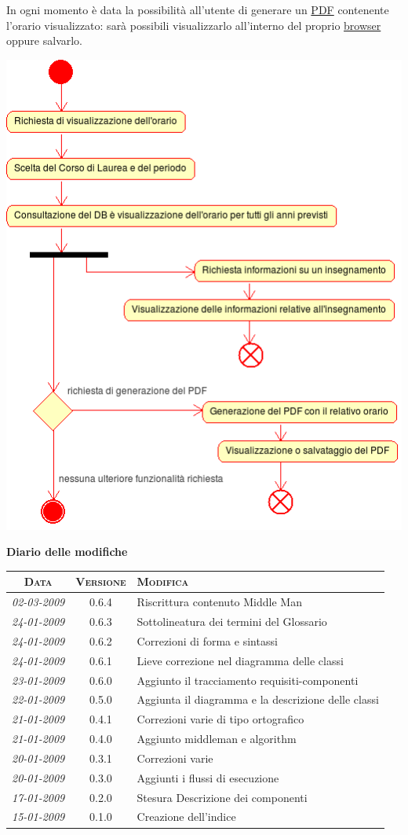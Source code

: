 \documentclass[11pt,a4paper]{article}
\newcommand{\modifiche} 
{
\newpage
\begin{center}
\textbf{Diario delle modifiche} \\
\bigskip
\begin{tabular}{|c|c|p{0.62\textwidth}|}
\hline
\textsc{Data} & \textsc{Versione} & \textsc{Modifica} \\
\hline
\hline
\textit{02-03-2009} & 0.6.4 & Riscrittura contenuto Middle Man \\
\hline
\textit{24-01-2009} & 0.6.3 & Sottolineatura dei termini del Glossario \\
\hline
\textit{24-01-2009} & 0.6.2 & Correzioni di forma e sintassi \\
\hline
\textit{24-01-2009} & 0.6.1 & Lieve correzione nel diagramma delle classi \\
\hline
\textit{23-01-2009} & 0.6.0 & Aggiunto il tracciamento requisiti-componenti \\
\hline
\textit{22-01-2009} & 0.5.0 & Aggiunta il diagramma e la descrizione delle classi \\
\hline
\textit{21-01-2009} & 0.4.1 & Correzioni varie di tipo ortografico\\
\hline
\textit{21-01-2009} & 0.4.0 & Aggiunto middleman e algorithm \\
\hline
\textit{20-01-2009} & 0.3.1 & Correzioni varie \\
\hline
\textit{20-01-2009} & 0.3.0 & Aggiunti i flussi di esecuzione \\
\hline
\textit{17-01-2009} & 0.2.0 & Stesura Descrizione dei componenti \\
\hline
\textit{15-01-2009} & 0.1.0 & Creazione dell'indice \\
\hline
\end{tabular}
\end{center}
}
\begin{document}
In ogni momento è data la possibilità all'utente di generare un \underline{PDF} contenente l'orario visualizzato: sarà possibili visualizzarlo all'interno del proprio \underline{browser} oppure salvarlo.
\begin{center}
 \includegraphics[scale=0.85]{images/consultazione_orario.png}
\end{center}

\modifiche
\end{document}
